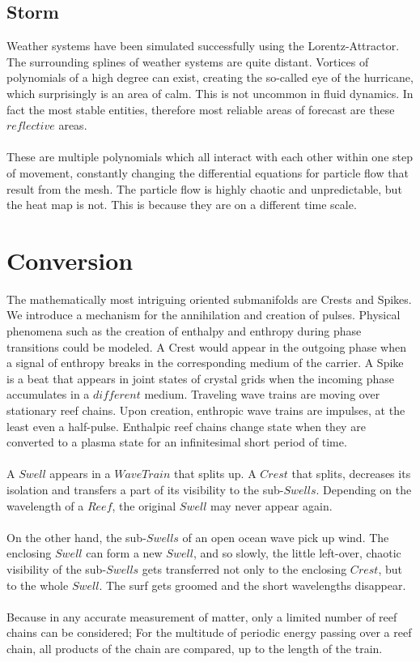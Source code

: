 \documentclass{report}
\begin{document}
\section{Storm}
Weather systems have been simulated successfully using the Lorentz-Attractor. The surrounding splines of weather systems are quite distant. Vortices of polynomials of a high degree can exist, creating the so-called eye of the hurricane, which surprisingly is an area of calm. This is not uncommon in fluid dynamics. In fact the most stable entities, therefore most reliable areas of forecast are these $reflective$ areas.\\\\
These are multiple polynomials which all interact with each other within one step of movement, constantly changing the differential equations for particle flow that result from the mesh. The particle flow is highly chaotic and unpredictable, but the heat map is not. This is because they are on a different time scale.

\chapter{Conversion}
The mathematically most intriguing oriented submanifolds are Crests and Spikes. We introduce a mechanism for the annihilation and creation of pulses. Physical phenomena such as the creation of enthalpy and enthropy during phase transitions could be modeled. A Crest would appear in the outgoing phase when a signal of enthropy breaks in the corresponding medium of the carrier. A Spike is a beat that appears in joint states of crystal grids when the incoming phase accumulates in a $different$ medium.
Traveling wave trains are moving over stationary reef chains. Upon creation, enthropic wave trains are impulses, at the least even a half-pulse. Enthalpic reef chains change state when they are converted to a plasma state for an infinitesimal short period of time.\\\\
A $Swell$ appears in a $Wave Train$ that splits up. A $Crest$ that splits, decreases its isolation and transfers a part of its visibility to the sub-$Swells$. Depending on the wavelength of a $Reef$, the original $Swell$ may never appear again.\\\\
On the other hand, the sub-$Swells$ of an open ocean wave pick up wind. The enclosing $Swell$ can form a new $Swell$, and so slowly, the little left-over, chaotic visibility of the sub-$Swells$ gets transferred not only to the enclosing $Crest$, but to the whole $Swell$. The surf gets groomed and the short wavelengths disappear.\\\\
Because in any accurate measurement of matter, only a limited number of reef chains can be considered; For the multitude of periodic energy passing over a reef chain, all products of the chain are compared, up to the length of the train.
\end{document}
